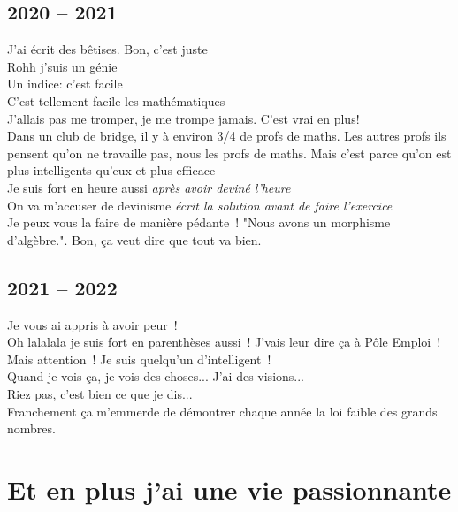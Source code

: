 \documentclass[french, a4paper, openany]{book}
\begin{document}
	\subsection*{2020 -- 2021}
		\noindent \og J'ai écrit des bêtises. Bon, c'est juste \fg \\
		\og Rohh j'suis un génie \fg \\
		\og Un indice: c'est facile \fg \\
		\og C'est tellement facile les mathématiques \fg \\
		\og J'allais pas me tromper, je me trompe jamais. C'est vrai en plus! \fg \\
		\og Dans un club de bridge, il y à environ 3/4 de profs de maths. Les autres profs ils pensent qu'on ne travaille pas, nous les profs de maths. Mais c'est parce qu'on est plus intelligents qu'eux et plus efficace \fg \\
		\og Je suis fort en heure aussi \fg \emph{après avoir deviné l'heure} \\
		\og On va m'accuser de devinisme \fg \emph{écrit la solution avant de faire l'exercice} \\
		\og Je peux vous la faire de manière pédante~! "Nous avons un morphisme d'algèbre.". Bon, ça veut dire que tout va bien. \fg \\
		
	\subsection*{2021 -- 2022}
		\noindent \og Je vous ai appris à avoir peur~! \fg \\
		\og Oh lalalala je suis fort en parenthèses aussi~! J'vais leur dire ça à Pôle Emploi~! \fg \\
		\og Mais attention~! Je suis quelqu'un d'intelligent~! \fg \\
		\og Quand je vois ça, je vois des choses... J'ai des visions... \fg \\
		\og Riez pas, c'est bien ce que je dis... \fg \\
		\og Franchement ça m'emmerde de démontrer chaque année la loi faible des grands nombres. \fg \\

\section*{Et en plus j'ai une vie passionnante}
\end{document}
